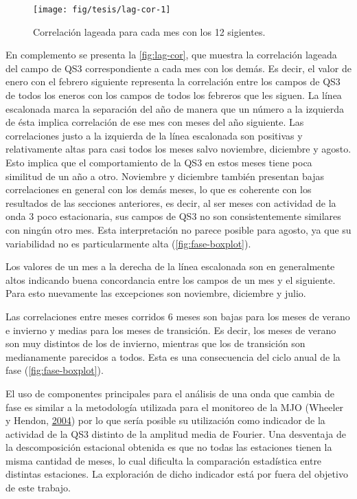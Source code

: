 \documentclass[spanish,a4paper,12pt,oneside]{book}
\begin{document}
\begin{figure}
\texttt{[image: fig/tesis/lag-cor-1]} \caption{Correlación lageada para cada mes con los 12 sigientes.}\label{fig:lag-cor}
\end{figure}

En complemento se presenta la \autoref{fig:lag-cor}, que muestra la
correlación lageada del campo de QS3 correspondiente a cada mes con los
demás. Es decir, el valor de enero con el febrero siguiente representa
la correlación entre los campos de QS3 de todos los eneros con los
campos de todos los febreros que les siguen. La línea escalonada marca
la separación del año de manera que un número a la izquierda de ésta
implica correlación de ese mes con meses del año siguiente. Las
correlaciones justo a la izquierda de la línea escalonada son positivas
y relativamente altas para casi todos los meses salvo noviembre,
diciembre y agosto. Esto implica que el comportamiento de la QS3 en
estos meses tiene poca similitud de un año a otro. Noviembre y diciembre
también presentan bajas correlaciones en general con los demás meses, lo
que es coherente con los resultados de las secciones anteriores, es
decir, al ser meses con actividad de la onda 3 poco estacionaria, sus
campos de QS3 no son consistentemente similares con ningún otro mes.
Esta interpretación no parece posible para agosto, ya que su
variabilidad no es particularmente alta (\autoref{fig:fase-boxplot}).

Los valores de un mes a la derecha de la línea escalonada son en
generalmente altos indicando buena concordancia entre los campos de un
mes y el siguiente. Para esto nuevamente las excepciones son noviembre,
diciembre y julio.

Las correlaciones entre meses corridos 6 meses son bajas para los meses
de verano e invierno y medias para los meses de transición. Es decir,
los meses de verano son muy distintos de los de invierno, mientras que
los de transición son medianamente parecidos a todos. Esta es una
consecuencia del ciclo anual de la fase (\autoref{fig:fase-boxplot}).

El uso de componentes principales para el análisis de una onda que
cambia de fase es similar a la metodología utilizada para el monitoreo
de la MJO (Wheeler y Hendon, \protect\hyperlink{ref-Wheeler2004}{2004})
por lo que sería posible su utilización como indicador de la actividad
de la QS3 distinto de la amplitud media de Fourier. Una desventaja de la
descomposición estacional obtenida es que no todas las estaciones tienen
la misma cantidad de meses, lo cual dificulta la comparación estadística
entre distintas estaciones. La exploración de dicho indicador está por
fuera del objetivo de este trabajo.
\end{document}

